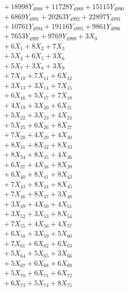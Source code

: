 \documentclass[a4paper,10pt]{article}
\begin{document}
{\begin{align}
&\;  + 18998 Y_{4988} + 11728 Y_{4989} + 15115 Y_{4990} \\[0.3ex]
&\;  + 6869 Y_{4991} + 20263 Y_{4992} + 22897 Y_{4993} \\[0.3ex]
&\;  + 10761 Y_{4994} + 19116 Y_{4995} + 9861 Y_{4996} \\[0.3ex]
&\;  + 7653 Y_{4997} + 9769 Y_{4999} + 3 X_{0} \\[0.3ex]
&\;  + 6 X_{1} + 8 X_{2} + 7 X_{3} \\[0.3ex]
&\;  + 5 X_{4} + 6 X_{5} + 3 X_{6} \\[0.3ex]
&\;  + 5 X_{7} + 3 X_{8} + 3 X_{9} \\[0.5ex]\allowbreak
&\;  + 7 X_{10} + 7 X_{11} + 6 X_{12} \\[0.3ex]
&\;  + 3 X_{13} + 3 X_{14} + 7 X_{15} \\[0.3ex]
&\;  + 6 X_{16} + 5 X_{17} + 7 X_{18} \\[0.3ex]
&\;  + 4 X_{19} + 3 X_{20} + 6 X_{21} \\[0.3ex]
&\;  + 5 X_{22} + 3 X_{23} + 4 X_{24} \\[0.3ex]
&\;  + 5 X_{25} + 6 X_{26} + 8 X_{27} \\[0.3ex]
&\;  + 7 X_{28} + 4 X_{29} + 4 X_{30} \\[0.3ex]
&\;  + 8 X_{31} + 8 X_{32} + 8 X_{33} \\[0.3ex]
&\;  + 8 X_{34} + 8 X_{35} + 4 X_{36} \\[0.3ex]
&\;  + 6 X_{37} + 4 X_{38} + 8 X_{39} \\[0.5ex]\allowbreak
&\;  + 6 X_{40} + 8 X_{41} + 8 X_{42} \\[0.3ex]
&\;  + 7 X_{43} + 8 X_{44} + 8 X_{45} \\[0.3ex]
&\;  + 7 X_{46} + 8 X_{47} + 3 X_{48} \\[0.3ex]
&\;  + 3 X_{49} + 4 X_{50} + 4 X_{51} \\[0.3ex]
&\;  + 3 X_{52} + 3 X_{53} + 8 X_{54} \\[0.3ex]
&\;  + 7 X_{55} + 4 X_{56} + 4 X_{57} \\[0.3ex]
&\;  + 6 X_{58} + 3 X_{59} + 5 X_{60} \\[0.3ex]
&\;  + 7 X_{61} + 6 X_{62} + 6 X_{63} \\[0.3ex]
&\;  + 5 X_{64} + 5 X_{65} + 3 X_{66} \\[0.3ex]
&\;  + 5 X_{67} + 6 X_{68} + 6 X_{69} \\[0.5ex]\allowbreak
&\;  + 5 X_{70} + 6 X_{71} + 6 X_{72} \\[0.3ex]
&\;  + 6 X_{73} + 5 X_{74} + 8 X_{75} \\[0.3ex]

\end{align}}
\end{document}
